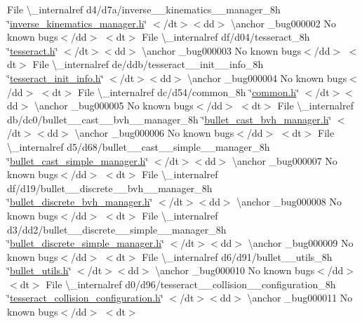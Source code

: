 \begin{DoxyRefList}
\+File \textbackslash{}\+\_\+internalref d4/d7a/inverse\+\_\+\+\_\+kinematics\+\_\+\+\_\+manager\+\_\+8h \char`\"{}\mbox{\hyperlink{inverse__kinematics__manager_8h}{inverse\+\_\+kinematics\+\_\+manager.\+h}}\char`\"{} $<$/dt$>$$<$dd$>$ \textbackslash{}anchor \+\_\+bug000002 No known bugs$<$/dd$>$ $<$dt$>$
\+File \textbackslash{}\+\_\+internalref df/d04/tesseract\+\_\+8h \char`\"{}\mbox{\hyperlink{tesseract_8h}{tesseract.\+h}}\char`\"{} $<$/dt$>$$<$dd$>$ \textbackslash{}anchor \+\_\+bug000003 No known bugs$<$/dd$>$ $<$dt$>$
\+File \textbackslash{}\+\_\+internalref de/ddb/tesseract\+\_\+\+\_\+init\+\_\+\+\_\+info\+\_\+8h \char`\"{}\mbox{\hyperlink{tesseract__init__info_8h}{tesseract\+\_\+init\+\_\+info.\+h}}\char`\"{} $<$/dt$>$$<$dd$>$ \textbackslash{}anchor \+\_\+bug000004 No known bugs$<$/dd$>$ $<$dt$>$
\+File \textbackslash{}\+\_\+internalref dc/d54/common\+\_\+8h \char`\"{}\mbox{\hyperlink{common_8h}{common.\+h}}\char`\"{} $<$/dt$>$$<$dd$>$ \textbackslash{}anchor \+\_\+bug000005 No known bugs$<$/dd$>$ $<$dt$>$
\+File \textbackslash{}\+\_\+internalref db/dc0/bullet\+\_\+\+\_\+cast\+\_\+\+\_\+bvh\+\_\+\+\_\+manager\+\_\+8h \char`\"{}\mbox{\hyperlink{bullet__cast__bvh__manager_8h}{bullet\+\_\+cast\+\_\+bvh\+\_\+manager.\+h}}\char`\"{} $<$/dt$>$$<$dd$>$ \textbackslash{}anchor \+\_\+bug000006 No known bugs$<$/dd$>$ $<$dt$>$
\+File \textbackslash{}\+\_\+internalref d5/d68/bullet\+\_\+\+\_\+cast\+\_\+\+\_\+simple\+\_\+\+\_\+manager\+\_\+8h \char`\"{}\mbox{\hyperlink{bullet__cast__simple__manager_8h}{bullet\+\_\+cast\+\_\+simple\+\_\+manager.\+h}}\char`\"{} $<$/dt$>$$<$dd$>$ \textbackslash{}anchor \+\_\+bug000007 No known bugs$<$/dd$>$ $<$dt$>$
\+File \textbackslash{}\+\_\+internalref df/d19/bullet\+\_\+\+\_\+discrete\+\_\+\+\_\+bvh\+\_\+\+\_\+manager\+\_\+8h \char`\"{}\mbox{\hyperlink{bullet__discrete__bvh__manager_8h}{bullet\+\_\+discrete\+\_\+bvh\+\_\+manager.\+h}}\char`\"{} $<$/dt$>$$<$dd$>$ \textbackslash{}anchor \+\_\+bug000008 No known bugs$<$/dd$>$ $<$dt$>$
\+File \textbackslash{}\+\_\+internalref d3/dd2/bullet\+\_\+\+\_\+discrete\+\_\+\+\_\+simple\+\_\+\+\_\+manager\+\_\+8h \char`\"{}\mbox{\hyperlink{bullet__discrete__simple__manager_8h}{bullet\+\_\+discrete\+\_\+simple\+\_\+manager.\+h}}\char`\"{} $<$/dt$>$$<$dd$>$ \textbackslash{}anchor \+\_\+bug000009 No known bugs$<$/dd$>$ $<$dt$>$
\+File \textbackslash{}\+\_\+internalref d6/d91/bullet\+\_\+\+\_\+utils\+\_\+8h \char`\"{}\mbox{\hyperlink{bullet__utils_8h}{bullet\+\_\+utils.\+h}}\char`\"{} $<$/dt$>$$<$dd$>$ \textbackslash{}anchor \+\_\+bug000010 No known bugs$<$/dd$>$ $<$dt$>$
\+File \textbackslash{}\+\_\+internalref d0/d96/tesseract\+\_\+\+\_\+collision\+\_\+\+\_\+configuration\+\_\+8h \char`\"{}\mbox{\hyperlink{tesseract__collision__configuration_8h}{tesseract\+\_\+collision\+\_\+configuration.\+h}}\char`\"{} $<$/dt$>$$<$dd$>$ \textbackslash{}anchor \+\_\+bug000011 No known bugs$<$/dd$>$ $<$dt$>$

\end{DoxyRefList}
